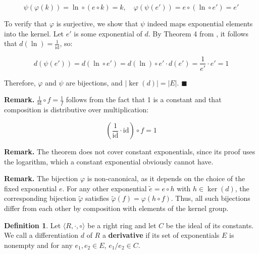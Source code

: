 \documentclass[12pt]{article}
\theoremstyle{definition}
\newtheorem{definition}{Definition}[section]
\begin{document}
\[
\psi(\varphi(k)) = \ln \circ (e \circ k) = k, \quad \varphi(\psi(e')) =  e \circ (\ln \circ e') = e'
\]

To verify that \(\varphi\) is surjective, we show that \(\psi\) indeed maps exponential elements into the kernel.
Let $e'$ is some exponential of $d$. By Theorem 4 from \cite{umerov2025}, it follows that $d(\ln) = \frac{1}{\mathrm{id}}$, so:

\[
d(\psi(e'))  = d(\ln \circ e') = d(\ln) \circ e' \cdot d(e') = \frac{1}{e'} \cdot e' = 1
\]

Therefore, \(\varphi\) and \(\psi\) are bijections, and \(|\ker(d)| = |E|\). $\blacksquare$

\vspace{10pt}
\textbf{Remark.} $\frac{1}{\mathrm{id}} \circ f = \frac{1}{f}$ follows from the fact that 1 is a 
constant and that composition is distributive over multiplication:

\[
(\frac{1}{\mathrm{id}} \cdot \mathrm{id}) \circ f = 1
\]

\vspace{10pt}
\textbf{Remark.} The theorem does not cover constant exponentials, since its proof uses the logarithm, 
which a constant exponential obviously cannot have.

\vspace{10pt}
\textbf{Remark.} The bijection \(\varphi\) is non-canonical, as it depends on the choice of the fixed exponential \(e\). 
For any other exponential \(\tilde{e} = e \circ h\) with \(h \in \ker(d)\), the corresponding bijection \(\tilde{\varphi}\) 
satisfies \(\tilde{\varphi}(f) = \varphi(h \circ f)\). 
Thus, all such bijections differ from each other by composition with elements of the kernel group. 

\begin{definition}
Let \(\langle R, \cdot, \circ \rangle\) be a right ring and let \(C\) be the ideal of its constants. 
We call a differentiation \(d\) of \(R\) a \textbf{derivative} if its set of exponentials \(E\) is 
nonempty and for any \(e_1, e_2 \in E\), \(e_1 / e_2 \in C\).
\end{definition}
\end{document}
